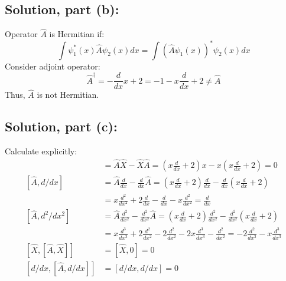 \documentclass[12pt]{article}
\begin{document}
    \subsection*{Solution, part (b):}
        Operator \(\hat{A}\) is Hermitian if:
        \[
        \int \psi_1^*(x)\hat{A}\psi_2(x)dx=\int (\hat{A}\psi_1(x))^*\psi_2(x)dx
        \]
        Consider adjoint operator:
        \[
        \hat{A}^\dagger=-\frac{d}{dx}x+2=-1-x\frac{d}{dx}+2\neq\hat{A}
        \]
        Thus, \(\hat{A}\) is not Hermitian.

    \subsection*{Solution, part (c):}
        Calculate explicitly:
        \begin{align*}
        [\hat{A},\hat{X}]&=\hat{A}\hat{X}-\hat{X}\hat{A}=\left(x\frac{d}{dx}+2\right)x-x\left(x\frac{d}{dx}+2\right)=0\\[6pt]
        [\hat{A},d/dx]&=\hat{A}\frac{d}{dx}-\frac{d}{dx}\hat{A}=\left(x\frac{d}{dx}+2\right)\frac{d}{dx}-\frac{d}{dx}\left(x\frac{d}{dx}+2\right)\\[4pt]
        &=x\frac{d^2}{dx^2}+2\frac{d}{dx}-\frac{d}{dx}-x\frac{d^2}{dx^2}=\frac{d}{dx}\\[6pt]
        [\hat{A}, d^2/dx^2]&=\hat{A}\frac{d^2}{dx^2}-\frac{d^2}{dx^2}\hat{A}=\left(x\frac{d}{dx}+2\right)\frac{d^2}{dx^2}-\frac{d^2}{dx^2}\left(x\frac{d}{dx}+2\right)\\[4pt]
        &=x\frac{d^3}{dx^3}+2\frac{d^2}{dx^2}-2\frac{d^2}{dx^2}-2x\frac{d^3}{dx^3}-\frac{d^2}{dx^2}=-2\frac{d^2}{dx^2}-x\frac{d^3}{dx^3}\\[6pt]
        [\hat{X},[\hat{A},\hat{X}]]&=[\hat{X},0]=0\\[6pt]
        [d/dx,[\hat{A},d/dx]]&=[d/dx,d/dx]=0
        \end{align*}
    
\end{document}
